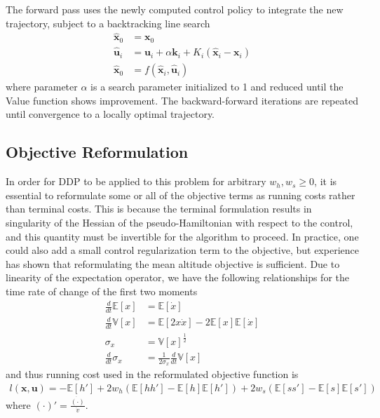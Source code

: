 \documentclass[letterpaper, paper,11pt]{AAS}
\newcommand{\state}{\ensuremath{\mathbf{x}}}
\newcommand{\control}{\ensuremath{\mathbf{u}}}
\newcommand{\E}[1]{\mathbb{E}\left[#1\right]}
\newcommand{\V}[1]{\mathbb{V}[#1]}
\begin{document}
The forward pass uses the newly computed control policy to integrate the new trajectory, subject to a backtracking line search
\begin{align}
\hat{\state}_0 &= \state_0 \\
\hat{\control}_{i} &= \control_i + \alpha \mathbf{k}_i + K_i(\hat{\state}_i - \state_i)\\
\hat{\state}_0 &= f(\hat{\state}_i,\hat{\control}_i)
\end{align}
where parameter $\alpha$ is a search parameter initialized to 1 and reduced until the Value function shows improvement. The backward-forward iterations are repeated until convergence to a locally optimal trajectory.

\subsection{Objective Reformulation}
In order for DDP to be applied to this problem for arbitrary $w_h,w_s\ge 0$, it is essential to reformulate some or all of the objective terms as running costs rather than terminal costs. This is because the terminal formulation results in singularity of the Hessian of the pseudo-Hamiltonian with respect to the control, and this quantity must be invertible for the algorithm to proceed. In practice, one could also add a small control regularization term to the objective, but experience has shown that reformulating the mean altitude objective is sufficient. Due to linearity of the expectation operator, we have the following relationships for the time rate of change of the first two moments
\begin{align}
\frac{d }{d t}\E{x} &= \E{\dot{x}} \\
\frac{d }{d t}\V{x} &= \E{2x\dot{x}} - 2\E{x}\E{\dot{x}} \\
\sigma_x &= \V{x}^{\frac{1}{2}} \\
\frac{d }{d t}\sigma_x &= \frac{1}{2\sigma_x}\frac{d }{d t}\V{x}
\end{align}
and thus running cost used in the reformulated objective function is 
\begin{align}
l(\state,\control) = -\E{h'} +  2w_h(\E{hh'}-\E{h}\E{h'}) + 2w_s(\E{ss'}-\E{s}\E{s'})
\end{align}
where $(\cdot)' = \frac{\dot{(\cdot)}}{\dot{v}}$.
\end{document}
